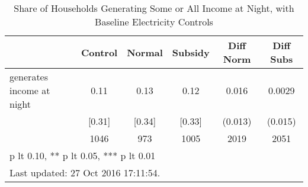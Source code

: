\begin{table}[htbp]\centering
\def\sym#1{\ifmmode^{#1}\else\(^{#1}\)\fi}
\caption{Share of Households Generating Some or All Income at Night, with Baseline Electricity Controls \label{tab:"balance"}}
\begin{tabular*}{0.9\hsize}{@{\hskip\tabcolsep\extracolsep\fill}l*{1}{ccccc}}
\toprule
                                &  Control&   Normal&  Subsidy&Diff Norm         &Diff Subs         \\
\midrule
generates income at night       &     0.11&     0.13&     0.12&    0.016         &   0.0029         \\
                                &   [0.31]&   [0.34]&   [0.33]&  (0.013)         &  (0.015)         \\
                                &     1046&      973&     1005&     2019         &     2051         \\
\bottomrule
\multicolumn{6}{l}{\footnotesize * p lt 0.10, ** p lt 0.05, *** p lt 0.01}\\
\multicolumn{6}{l}{\footnotesize Last updated: 27 Oct 2016 17:11:54.}\\
\end{tabular*}
\end{table}
